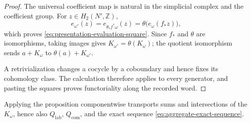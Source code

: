 \begin{proof}
The universal coefficient map is natural in the simplicial complex and the
coefficient group.  For \(z\in H_2(N',\mathbb Z)\),
\[
 e_{\omega'}(z)
 =e_{\theta_*f^*\omega}(z)
 =\theta\bigl(e_\omega(f_*z)\bigr),
\]
which proves \eqref{eq:presentation-evaluation-square}.  Since \(f_*\) and
\(\theta\) are isomorphisms, taking images gives
\(K_{\omega'}=\theta(K_\omega)\); the quotient isomorphism sends
\(a+K_\omega\) to \(\theta(a)+K_{\omega'}\).

A retrivialization changes a cocycle by a coboundary and hence fixes its
cohomology class.  The calculation therefore applies to every generator,
and pasting the squares proves functoriality along the recorded word.
\end{proof}

Applying the proposition componentwise transports sums and intersections of
the \(K_\omega\), hence also \(Q_{\mathrm{lab}}\),
\(Q_{\mathrm{com}}\), and the exact sequence
\eqref{eq:aggregate-exact-sequence}.
